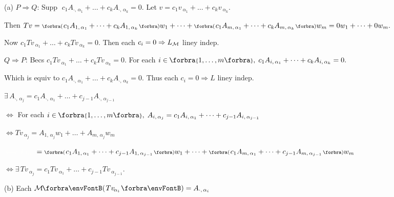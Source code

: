 (a) $P\Rightarrow Q:$\,\;Supp $\;c_1A_{\cdot,\,{\alpha_1}}+\dots+c_kA_{\cdot,\,{\alpha_k}}=0.$ \;Let $v=c_1v_{\:\!\!\alpha_1}+\dots+c_kv_{\:\!\!\alpha_k}.$\par\quad\Ha
{}Then $Tv=\BigPar{c_1A_{1,\,{\alpha_1}}+\dots+c_kA_{1,\,{\alpha_k}}}w_1+\dots+\BigPar{c_1A_{m,\,{\alpha_1}}+\dots+c_kA_{m,\,{\alpha_k}}}w_m=0w_1+\dots+0w_m.$\par\quad\Ha
{}Now $c_1Tv_{\:\!\!\alpha_1}+\dots+c_kTv_{\:\!\!\alpha_k}=0.$ Then each $c_i=0\Rightarrow L_{\mathcal{M}}$ liney indep.\vspace{4pt}\par\quad\Ha
$Q\Rightarrow P:$\,\;Becs $c_1Tv_{\:\!\!\alpha_1}+\dots+c_kTv_{\:\!\!\alpha_k}=0.$ For each $i\in\;\!\!\Bra{1,\dots,m},\;c_1A_{i,\,{\alpha_1}}+\dots+c_kA_{i,\,{\alpha_k}}=0.$\par\quad\Ha
{}Which is equiv to $c_1A_{\cdot,\,{\alpha_1}}+\dots+c_kA_{\cdot,\,{\alpha_k}}=0.$ \;Thus each $c_i=0\Rightarrow L$ liney indep.\par\vspace{4pt}\quad\Ha
\Or\;$\exists\,A_{\cdot,\,{\alpha_j}}=c_1A_{\cdot,\,{\alpha_1}}+\dots+c_{j-1}A_{\cdot,\,{\alpha_{j-1}}}$\par\quad\Ha
\Blind{\Or\;}$\Longleftrightarrow$ For each $i\in\;\!\!\Bra{1,\dots,m},\;A_{i,\,{\alpha_j}}=c_1A_{i,\,{\alpha_1}}+\dots+c_{j-1}A_{i,\,{\alpha_{j-1}}}$\par\quad\Ha
\Blind{\Or\;}$\Longleftrightarrow Tv_{\:\!\!\alpha_j}=A_{1,\,{\alpha_j}}w_1+\dots+A_{m,\,{\alpha_j}}w_m$\par\vspace{2pt}\quad\Ha
\Blind{\Or\;}$\Blind{\Longleftrightarrow Tv_{\:\!\!\alpha_j}}=\BigPar{c_1A_{1,\,{\alpha_1}}+\dots+c_{j-1}A_{1,\,{\alpha_{j-1}}}}w_1+\dots+\BigPar{c_1A_{m,\,{\alpha_1}}+\dots+c_{j-1}A_{m,\,{\alpha_{j-1}}}}w_m$\par\vspace{2pt}\quad\Ha
\Blind{\Or\;}$\Longleftrightarrow\exists\,Tv_{\:\!\!\alpha_j}=c_1Tv_{\:\!\!\alpha_1}+\dots+c_{j-1}Tv_{\:\!\!\alpha_{j-1}}.$\par\vspace{6pt}\quad
(b) Each $\Mt{Tv_{\:\!\!\alpha_i}}=A_{\cdot,\,\alpha_i}$\par\quad\Hb
